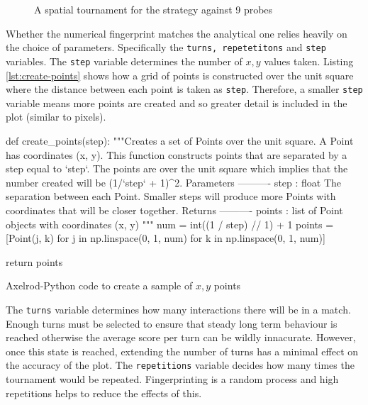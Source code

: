 \begin{figure}[!hbtp]
    \begin{center}
        
        \caption{A spatial tournament for the strategy against 9 probes}\label{fig:spatialtourn}
    \end{center}
\end{figure}


Whether the numerical fingerprint matches the analytical one relies heavily on the choice of parameters.
Specifically the \texttt{turns, repetetitons} and \texttt{step} variables.
The \texttt{step} variable determines the number of $x,y$ values taken.
Listing \ref{lst:create-points} shows how a grid of points is constructed over the unit square where the distance between each point is taken as \texttt{step}.
Therefore, a smaller \texttt{step} variable means more points are created and so greater detail is included in the plot (similar to pixels).

\begin{listing}[hbtp!]
\begin{SourceCode}
def create_points(step):
    """Creates a set of Points over the unit square.
    A Point has coordinates (x, y). This function constructs points that are
    separated by a step equal to `step`. The points are over the unit
    square which implies that the number created will be (1/`step` + 1)^2.
    Parameters
    ----------
    step : float
        The separation between each Point. Smaller steps will produce more
        Points with coordinates that will be closer together.
    Returns
    ----------
    points : list
        of Point objects with coordinates (x, y)
    """
    num = int((1 / step) // 1) + 1
    points = [Point(j, k) for j in np.linspace(0, 1, num)
              for k in np.linspace(0, 1, num)]

    return points
\end{SourceCode}
\caption{Axelrod-Python code to create a sample of $x,y$ points}
\label{lst:create-points}
\end{listing}

The \texttt{turns} variable determines how many interactions there will be in a match.
Enough turns must be selected to ensure that steady long term behaviour is reached otherwise the average score per turn can be wildly innacurate.
However, once this state is reached, extending the number of turns has a minimal effect on the accuracy of the plot.
The \texttt{repetitions} variable decides how many times the tournament would be repeated.
Fingerprinting is a random process and high repetitions helps to reduce the effects of this.

